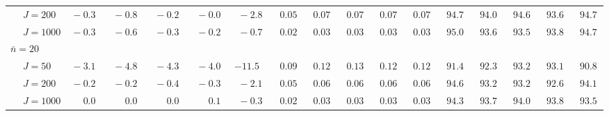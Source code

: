 \begin{sidewaystable}
\begin{threeparttable}
\begin{tabular}{llccccccccccccccc}
 & \nopagebreak $\;J=200$  & $\phantom{0}{-}0.3\phantom{0}$ & $\phantom{0}{-}0.8\phantom{0}$ & $\phantom{0}{-}0.2\phantom{0}$ & $\phantom{0}{-}0.0\phantom{0}$ & $\phantom{0}{-}2.8\phantom{0}$ & $\phantom{0}0.05\phantom{0}$ & $\phantom{0}0.07\phantom{0}$ & $\phantom{0}0.07\phantom{0}$ & $\phantom{0}0.07\phantom{0}$ & $\phantom{0}0.07\phantom{0}$ & $\phantom{0}94.7\phantom{0}$ & $\phantom{0}94.0\phantom{0}$ & $\phantom{0}94.6\phantom{0}$ & $\phantom{0}93.6\phantom{0}$ & $\phantom{0}94.7\phantom{0}$ \\
 & \nopagebreak $\;J=1000$  & $\phantom{0}{-}0.3\phantom{0}$ & $\phantom{0}{-}0.6\phantom{0}$ & $\phantom{0}{-}0.3\phantom{0}$ & $\phantom{0}{-}0.2\phantom{0}$ & $\phantom{0}{-}0.7\phantom{0}$ & $\phantom{0}0.02\phantom{0}$ & $\phantom{0}0.03\phantom{0}$ & $\phantom{0}0.03\phantom{0}$ & $\phantom{0}0.03\phantom{0}$ & $\phantom{0}0.03\phantom{0}$ & $\phantom{0}95.0\phantom{0}$ & $\phantom{0}93.6\phantom{0}$ & $\phantom{0}93.5\phantom{0}$ & $\phantom{0}93.8\phantom{0}$ & $\phantom{0}94.7\phantom{0}$ \\
\multicolumn{4}{l}{$\bar{n}=20$} \\  & \nopagebreak $\;J=50$  & $\phantom{0}{-}3.1\phantom{0}$ & $\phantom{0}{-}4.8\phantom{0}$ & $\phantom{0}{-}4.3\phantom{0}$ & $\phantom{0}{-}4.0\phantom{0}$ & ${-}11.5\phantom{0}$ & $\phantom{0}0.09\phantom{0}$ & $\phantom{0}0.12\phantom{0}$ & $\phantom{0}0.13\phantom{0}$ & $\phantom{0}0.12\phantom{0}$ & $\phantom{0}0.12\phantom{0}$ & $\phantom{0}91.4\phantom{0}$ & $\phantom{0}92.3\phantom{0}$ & $\phantom{0}93.2\phantom{0}$ & $\phantom{0}93.1\phantom{0}$ & $\phantom{0}90.8\phantom{0}$ \\
 & \nopagebreak $\;J=200$  & $\phantom{0}{-}0.2\phantom{0}$ & $\phantom{0}{-}0.2\phantom{0}$ & $\phantom{0}{-}0.4\phantom{0}$ & $\phantom{0}{-}0.3\phantom{0}$ & $\phantom{0}{-}2.1\phantom{0}$ & $\phantom{0}0.05\phantom{0}$ & $\phantom{0}0.06\phantom{0}$ & $\phantom{0}0.06\phantom{0}$ & $\phantom{0}0.06\phantom{0}$ & $\phantom{0}0.06\phantom{0}$ & $\phantom{0}94.6\phantom{0}$ & $\phantom{0}93.2\phantom{0}$ & $\phantom{0}93.2\phantom{0}$ & $\phantom{0}92.6\phantom{0}$ & $\phantom{0}94.1\phantom{0}$ \\
 & \nopagebreak $\;J=1000$  & $\phantom{0}\phantom{-}0.0\phantom{0}$ & $\phantom{0}\phantom{-}0.0\phantom{0}$ & $\phantom{0}\phantom{-}0.0\phantom{0}$ & $\phantom{0}\phantom{-}0.1\phantom{0}$ & $\phantom{0}{-}0.3\phantom{0}$ & $\phantom{0}0.02\phantom{0}$ & $\phantom{0}0.03\phantom{0}$ & $\phantom{0}0.03\phantom{0}$ & $\phantom{0}0.03\phantom{0}$ & $\phantom{0}0.03\phantom{0}$ & $\phantom{0}94.3\phantom{0}$ & $\phantom{0}93.7\phantom{0}$ & $\phantom{0}94.0\phantom{0}$ & $\phantom{0}93.8\phantom{0}$ & $\phantom{0}93.5\phantom{0}$ \\

\end{tabular}
\end{threeparttable}
\end{sidewaystable}
